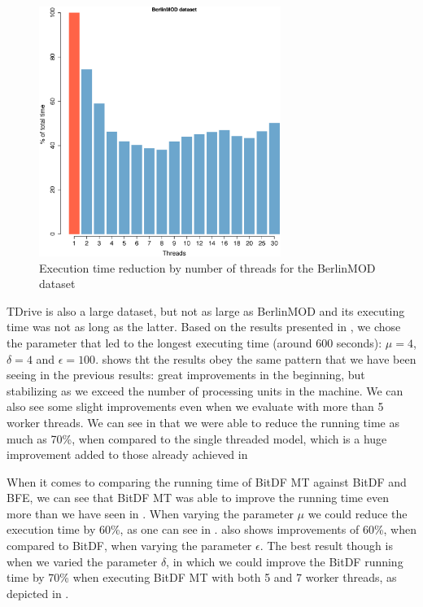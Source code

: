 {\begin{figure}[h!]
    \centering
    \includegraphics[width=0.7\textwidth]{images/BerlinMOD_thread.eps}
    \caption{Execution time reduction by number of threads for the BerlinMOD dataset}
    \label{fig:berlinmod_threads}
\end{figure}

TDrive is also a large dataset, but not as large as BerlinMOD and its executing time was not as long as the latter.
Based on the results presented in , we chose the parameter that led to the longest executing time
(around 600 seconds): $\mu=4$, $\delta=4$ and $\epsilon=100$.  shows tht the results obey the
same pattern that we have been seeing in the previous results: great improvements in the beginning, but stabilizing as
we exceed the number of processing units in the machine. We can also see some slight improvements even when we evaluate
with more than 5 worker threads. We can see in  that we were able to reduce the running time
as much as 70\%, when compared to the single threaded model, which is a huge improvement added to those already achieved
in 

When it comes to comparing the running time of BitDF MT against BitDF and BFE, we can see that BitDF MT was able to
improve the running time even more than we have seen in . When varying the parameter $\mu$ we could
reduce the execution time by 60\%, as one can see in .
 also shows improvements of 60\%, when compared to BitDF, when varying the parameter
$\epsilon$. The best result though is when we varied the parameter $\delta$, in which we could improve the BitDF running
time by 70\% when executing BitDF MT with both 5 and 7 worker threads, as depicted in
.

}
